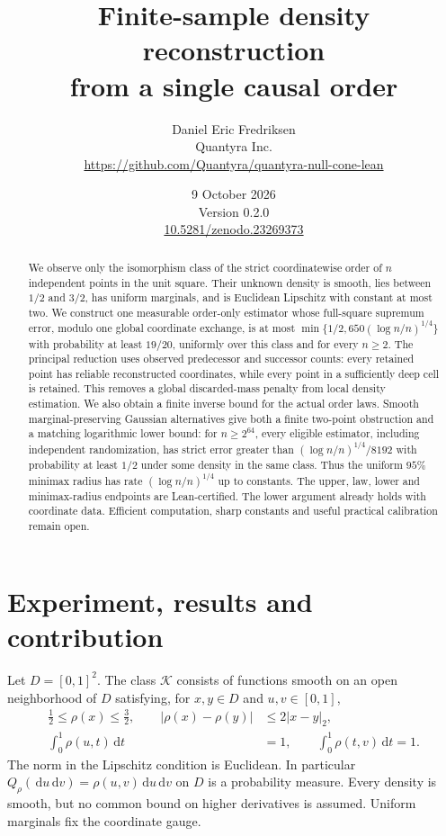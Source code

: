 \documentclass[11pt]{article}
\title{Finite-sample density reconstruction\\from a single causal order}
\author{Daniel Eric Fredriksen\\Quantyra Inc.\\
\url{https://github.com/Quantyra/quantyra-null-cone-lean}}
\date{9 October 2026\\Version 0.2.0\\\href{https://doi.org/10.5281/zenodo.23269373}{10.5281/zenodo.23269373}}
\theoremstyle{remark}
\newcommand{\K}{\mathcal K}
\newcommand{\dd}{\,\mathrm d}
\begin{document}
\maketitle
\begin{abstract}
We observe only the isomorphism class of the strict coordinatewise order
of $n$ independent points in the unit square. Their unknown density is
smooth, lies between $1/2$ and $3/2$, has uniform marginals, and is
Euclidean Lipschitz with constant at most two. We construct one measurable
order-only estimator whose full-square supremum error, modulo one global
coordinate exchange, is at most
$\min\{1/2,650(\log n/n)^{1/4}\}$ with probability at least $19/20$,
uniformly over this class and for every $n\ge2$.
The principal reduction uses observed predecessor and successor counts:
every retained point has reliable reconstructed coordinates, while every
point in a sufficiently deep cell is retained. This removes a global
discarded-mass penalty from local density estimation. We also obtain a
finite inverse bound for the actual order laws. Smooth marginal-preserving
Gaussian alternatives give both a finite two-point obstruction and a
matching logarithmic lower bound: for $n\ge2^{64}$, every eligible
estimator, including independent randomization, has strict error greater
than $(\log n/n)^{1/4}/8192$ with probability at least $1/2$ under some
density in the same class. Thus the uniform $95\%$ minimax radius has
rate $(\log n/n)^{1/4}$ up to constants. The upper, law, lower and
minimax-radius endpoints are Lean-certified. The lower argument already
holds with coordinate data. Efficient computation, sharp constants and
useful practical calibration remain open.
\end{abstract}

\section{Experiment, results and contribution}
\label{sec:results}
Let $D=[0,1]^2$. The class $\K$ consists of functions smooth on an open
neighborhood of $D$ satisfying, for $x,y\in D$ and $u,v\in[0,1]$,
\begin{align}
 \tfrac12\le\rho(x)\le\tfrac32,\qquad
 |\rho(x)-\rho(y)|&\le2|x-y|_2, \label{eq:class}\\
 \int_0^1\rho(u,t)\dd t&=1,\qquad
 \int_0^1\rho(t,v)\dd t=1. \nonumber
\end{align}
The norm in the Lipschitz condition is Euclidean. In particular
$Q_\rho(\dd u\dd v)=\rho(u,v)\dd u\dd v$ on $D$ is a probability measure.
Every density is smooth, but no common bound on higher derivatives is
assumed. Uniform marginals fix the coordinate gauge.
\end{document}
